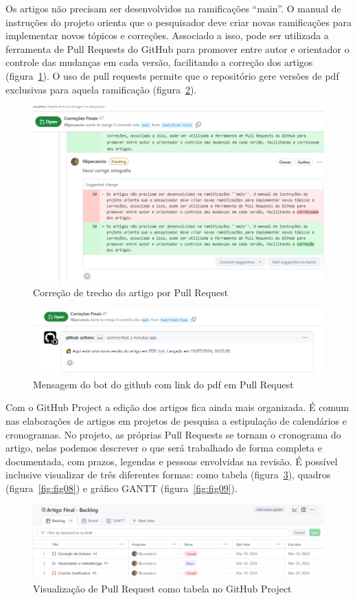 Os artigos não precisam ser desenvolvidos na ramificações ``main''. O manual de instruções do projeto orienta que o pesquisador deve criar novas ramificações para implementar novos tópicos e correções. Associado a isso, pode ser utilizada a ferramenta de Pull Requests do GitHub para promover entre autor e orientador o controle das mudanças em cada versão, facilitando a correção dos artigos (figura~\ref{fig:fig05}). O uso de pull requests permite que o repositório gere versões de pdf exclusivas para aquela ramificação (figura~\ref{fig:fig06}).

\begin{figure}[H]
	\centering
	\includegraphics[width=.6\textwidth]{./images/fig05.png}
	\caption{Correção de trecho do artigo por Pull Request}
	\label{fig:fig05}
\end{figure}

\begin{figure}[H]
	\centering
	\includegraphics[width=.6\textwidth]{./images/fig06.png}
	\caption{Mensagem do bot do github com link do pdf em Pull Request}
	\label{fig:fig06}
\end{figure}

Com o GitHub Project a edição dos artigos fica ainda mais organizada. É comum nas elaborações de artigos em projetos de pesquisa a estipulação de calendários e cronogramas. No projeto, as próprias Pull Requests se tornam o cronograma do artigo, nelas podemos descrever o que será trabalhado de forma completa e documentada, com prazos, legendas e pessoas envolvidas na revisão. É possível inclusive visualizar de três diferentes formas: como tabela (figura~\ref{fig:fig07}), quadros (figura~\ref{fig:fig08}) e gráfico GANTT (figura~\ref{fig:fig09}).

\begin{figure}[H]
	\centering
	\includegraphics[width=.8\textwidth]{./images/fig07.png}
	\caption{Visualização de Pull Request como tabela no GitHub Project}
	\label{fig:fig07}
\end{figure}


